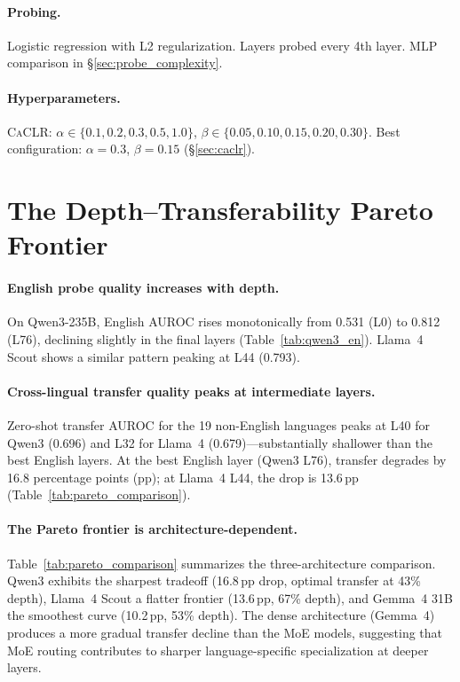 \documentclass[11pt,a4paper]{article}
\newcommand{\caclr}{\textsc{CaCLR}}
\begin{document}
\paragraph{Probing.}
Logistic regression with L2 regularization.
Layers probed every 4th layer.
MLP comparison in \S\ref{sec:probe_complexity}.

\paragraph{Hyperparameters.}
\caclr{}: $\alpha \in \{0.1, 0.2, 0.3, 0.5, 1.0\}$, $\beta \in \{0.05, 0.10, 0.15, 0.20, 0.30\}$.
Best configuration: $\alpha = 0.3$, $\beta = 0.15$ (\S\ref{sec:caclr}).

\section{The Depth--Transferability Pareto Frontier}
\label{sec:pareto}

\paragraph{English probe quality increases with depth.}
On Qwen3-235B, English AUROC rises monotonically from 0.531 (L0) to 0.812 (L76), declining slightly in the final layers (Table~\ref{tab:qwen3_en}).
Llama~4 Scout shows a similar pattern peaking at L44 (0.793).

\paragraph{Cross-lingual transfer quality peaks at intermediate layers.}
Zero-shot transfer AUROC for the 19 non-English languages peaks at L40 for Qwen3 (0.696) and L32 for Llama~4 (0.679)---substantially shallower than the best English layers.
At the best English layer (Qwen3 L76), transfer degrades by 16.8 percentage points (pp); at Llama~4 L44, the drop is 13.6\,pp (Table~\ref{tab:pareto_comparison}).

\paragraph{The Pareto frontier is architecture-dependent.}
Table~\ref{tab:pareto_comparison} summarizes the three-architecture comparison.
Qwen3 exhibits the sharpest tradeoff (16.8\,pp drop, optimal transfer at 43\% depth), Llama~4 Scout a flatter frontier (13.6\,pp, 67\% depth), and Gemma~4 31B the smoothest curve (10.2\,pp, 53\% depth).
The dense architecture (Gemma~4) produces a more gradual transfer decline than the MoE models, suggesting that MoE routing contributes to sharper language-specific specialization at deeper layers.
\end{document}
